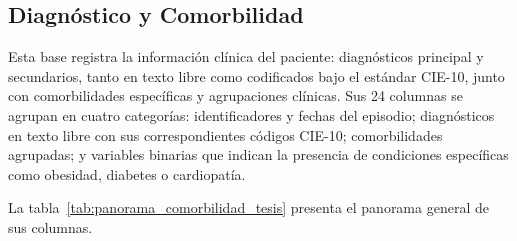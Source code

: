 \begin{table}[H]
\centering
\caption{Volumen, estructura y propósito por fuente de datos}
\label{tab:resumen_fuentes}
\small
{}
\end{table}

\subsection{Diagnóstico y Comorbilidad}

Esta base registra la información clínica del paciente: diagnósticos principal y secundarios, tanto en texto libre como codificados bajo el estándar CIE-10, junto con comorbilidades específicas y agrupaciones clínicas. Sus 24 columnas se agrupan en cuatro categorías: identificadores y fechas del episodio; diagnósticos en texto libre con sus correspondientes códigos CIE-10; comorbilidades agrupadas; y variables binarias que indican la presencia de condiciones específicas como obesidad, diabetes o cardiopatía.

La tabla~\ref{tab:panorama_comorbilidad_tesis} presenta el panorama general de sus columnas.

